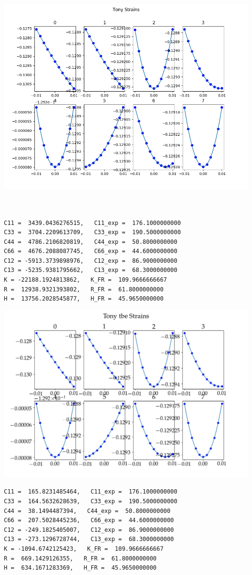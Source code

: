 \documentclass[11pt]{article}
\begin{document}
\begin{enumerate}
\begin{enumerate}
\begin{enumerate}
\begin{center}
\includegraphics[width=.9\linewidth]{Images/applied_tony_strains.png}
\end{center}
\begin{verbatim}


C11 =  3439.0436276515,   C11_exp =  176.1000000000
C33 =  3704.2209613709,   C33_exp =  190.5000000000
C44 =  4786.2106820819,   C44_exp =  50.8000000000
C66 =  4676.2088087745,   C66_exp =  44.6000000000
C12 = -5913.3739898976,   C12_exp =  86.9000000000
C13 = -5235.9381795662,   C13_exp =  68.3000000000
K = -22188.1924813862,   K_FR =  109.9666666667
R =  12938.9321393802,   R_FR =  61.8000000000
H =  13756.2028545877,   H_FR =  45.9650000000

\end{verbatim}
\begin{center}
\includegraphics[width=.9\linewidth]{Images/tonytbestrains.png}
\end{center}
\begin{verbatim}
C11 =  165.8231485464,   C11_exp =  176.1000000000
C33 =  164.5632628639,   C33_exp =  190.5000000000
C44 =  38.1494487394,   C44_exp =  50.8000000000
C66 =  207.5028445236,   C66_exp =  44.6000000000
C12 = -249.1825405007,   C12_exp =  86.9000000000
C13 = -273.1296728744,   C13_exp =  68.3000000000
K = -1094.6742125423,   K_FR =  109.9666666667
R =  669.1429126355,   R_FR =  61.8000000000
H =  634.1671283369,   H_FR =  45.9650000000 


\end{verbatim}
\end{enumerate}
\end{enumerate}
\end{enumerate}
\end{document}

